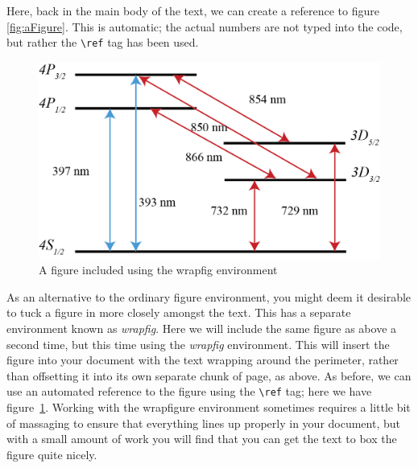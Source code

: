 Here, back in the main body of the text, we can create a reference to figure \ref{fig:aFigure}.  This is automatic; the actual numbers are not typed into the code, but rather the \texttt{\textbackslash ref} tag has been used.

\newpage
\begin{figure}
\centering
\vspace{-.1\baselineskip}
\includegraphics[width=.4\textwidth]{Chapters/Figures/calcium_levels_1-1.PNG}
\caption[Another short-form caption]{A figure included using the wrapfig environment}
\label{fig:anotherFigure}
\end{figure}
As an alternative to the ordinary figure environment, you might deem it desirable to tuck a figure in more closely amongst the text.  This has a separate environment known as \emph{wrapfig}.  Here we will include the same figure as above a second time, but this time using the \emph{wrapfig} environment.  This will insert the figure into your document with the text wrapping around the perimeter, rather than offsetting it into its own separate chunk of page, as above.    As before, we can use an automated reference to the figure using the \texttt{\textbackslash ref} tag; here we have figure~\ref{fig:anotherFigure}.  Working with the wrapfigure environment sometimes requires a little bit of massaging to ensure that everything lines up properly in your document, but with a small amount of work  you will find that you can get the text to box the figure quite nicely.

